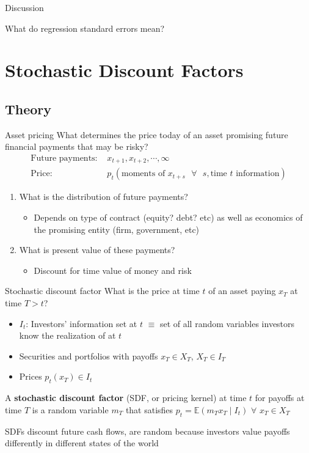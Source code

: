 \documentclass[xcolor=table, aspectratio=169]{beamer}
\begin{document}
\begin{frame}[t]{Discussion}

What do regression standard errors mean?

\end{frame}


\section{Stochastic Discount Factors}
\subsection{Theory}
\begin{frame}{Asset pricing}
What determines the price today of an asset promising future financial payments that may be risky?
\begin{align*}
\text{Future payments: }& x_{t+1}, x_{t+2}, \cdots, \infty \\
\text{Price: }& p_t( \text{moments of } x_{t+s} \text{ } \forall \text{ } s, \text{time } t \text{ information} )
\end{align*}
\vskip -4pt
\begin{enumerate}
\item What is the distribution of future payments? 
\begin{itemize}
\item Depends on type of contract (equity? debt? etc) as well as economics of the promising entity (firm, government, etc)
\end{itemize}
\vskip 8pt
\item What is present value of these payments?
\begin{itemize}
\item Discount for time value of money and risk
\end{itemize}
\end{enumerate}
\end{frame}

\begin{frame}{Stochastic discount factor}
What is the price at time $t$ of an asset paying $x_T$ at time $T > t$?

\begin{itemize}
\item $I_t$: Investors' information set at $t$ $\equiv$ set of all random variables investors know the realization of at $t$
\item Securities and portfolios with payoffs $x_T \in X_T$, $X_T \in I_T$
\item Prices $p_t(x_T) \in I_t$
\end{itemize}
\begin{definition}
A \textbf{stochastic discount factor} (SDF, or pricing kernel) at time $t$ for payoffs at time $T$ is a random variable $m_T$ that satisfies $p_t = \mathbb{E}\left( m_T x_T \middle\vert I_t \right)$ $\forall$ $x_T \in X_T$
\end{definition}

\vskip 8pt

SDFs discount future cash flows, are random because investors value payoffs differently in different states of the world
\end{frame}
\end{document}
